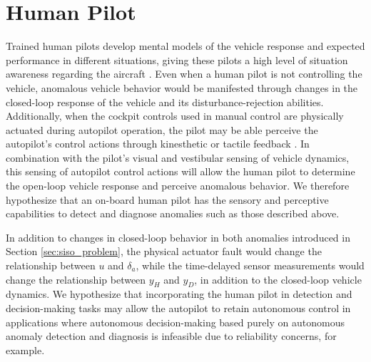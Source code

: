 \section{Human Pilot} \label{sec:siso_sc_human}
Trained human pilots develop mental models of the vehicle response and expected performance in different situations, giving these pilots a high level of situation awareness regarding the aircraft \cite{endsley1995toward}. Even when a human pilot is not controlling the vehicle, anomalous vehicle behavior would be manifested through changes in the closed-loop response of the vehicle and its disturbance-rejection abilities. Additionally, when the cockpit controls used in manual control are physically actuated during autopilot operation, the pilot may be able perceive the autopilot's control actions through kinesthetic or tactile feedback \cite{tan1994human, yang2007development}. In combination with the pilot's visual and vestibular sensing of vehicle dynamics, this sensing of autopilot control actions will allow the human pilot to determine the open-loop vehicle response and perceive anomalous behavior. We therefore hypothesize that an on-board human pilot has the sensory and perceptive capabilities to detect and diagnose anomalies such as those described above. 

In addition to changes in closed-loop behavior in both anomalies introduced in Section \ref{sec:siso_problem}, the physical actuator fault would change the relationship between $u$ and $\delta_a$, while the time-delayed sensor measurements would change the relationship between $y_{H}$ and $y_{D}$, in addition to the closed-loop vehicle dynamics. We hypothesize that incorporating the human pilot in detection and decision-making tasks may allow the autopilot to retain autonomous control in applications where autonomous decision-making based purely on autonomous anomaly detection and diagnosis is infeasible due to reliability concerns, for example. 



